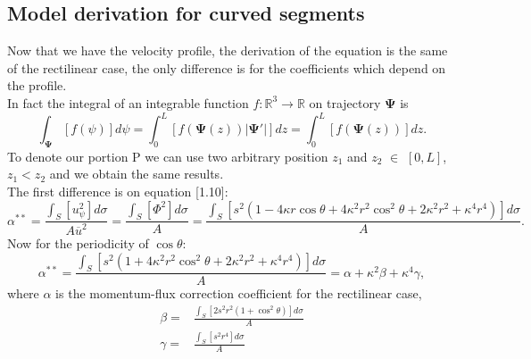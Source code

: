 \documentclass[a4paper]{report}
\begin{document}
\subsection{Model derivation for curved segments}
Now that we have the velocity profile, the derivation of the equation is the same of the rectilinear case, the only difference is for the coefficients which depend on the profile.\\
In fact the integral of an integrable  function $f: \mathbb{R}^3 \rightarrow \mathbb{R}$ on trajectory $\boldsymbol{\Psi}$ is
\begin{equation}
\int_{\boldsymbol{\Psi}} [f(\psi) ] d\psi =\int_0^L [f(\boldsymbol{\Psi}(z)) |\boldsymbol{\Psi}'|]dz=\int_0^L [f(\boldsymbol{\Psi}(z))] dz.
\end{equation}
To denote our portion P we can use two arbitrary position $z_1$ and $z_2$ $\in$ $[0,L]$, $z_1<z_2$ and we obtain the same results.\\
The first difference is on equation [1.10]:
\begin{equation*}
\alpha^{**}= \frac{\int_S [u_{\psi}^2] d\sigma}{A \overline{u}^2}=\frac{\int_S [\Phi^2]d\sigma}{A}= \frac{\int_S [s^2(1-4 \kappa r \cos \theta +4 \kappa^2 r^2 \cos^2 \theta + 2 \kappa^2 r^2 + \kappa^4 r^4)]d\sigma}{A}.
\end{equation*}
Now for the periodicity of $\cos \theta$:
\begin{equation}
\alpha^{**}= \frac{\int_S [s^2(1+4 \kappa^2 r^2 \cos^2 \theta + 2 \kappa^2 r^2 + \kappa^4 r^4)]d\sigma}{A}=\alpha +\kappa^2 \beta + \kappa^4 \gamma,
\end{equation}
where $\alpha$ is the momentum-flux correction coefficient for the rectilinear case,
\begin{equation}
\begin{split}
\beta=&\frac{\int_S [2 s^2 r^2 (1+\cos^2 \theta)]d\sigma}{A}\\
\gamma=&\frac{\int_S[s^2 r^4]d\sigma}{A}
\end{split}
\end{equation}
\end{document}
